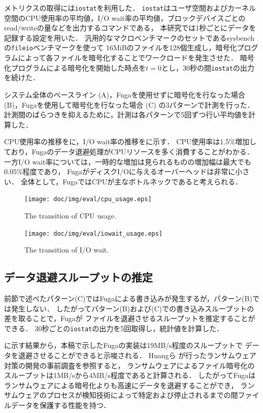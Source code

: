 メトリクスの取得には\texttt{iostat}を利用した．
\texttt{iostat}はユーザ空間およびカーネル空間のCPU使用率の平均値，I/O wait率の平均値，ブロックデバイスごとのread/writeの量などを出力するコマンドである，
本研究では1秒ごとにデータを記録する設定を用いた．
汎用的なマクロベンチマークのセットであるsysbench \cite{sysbench:online} の\texttt{fileio}ベンチマークを使って
16MiBのファイルを128個生成し，暗号化プログラムによって各ファイルを暗号化することでワークロードを発生させた．
暗号化プログラムによる暗号化を開始した時点を$t = 0$とし，30秒の間\texttt{iostat}の出力を続けた．

システム全体のベースライン (A)，Fugaを使用せずに暗号化を行なった場合 (B)，Fugaを使用して暗号化を行なった場合 (C) の3パターンで計測を行った．
計測間のばらつきを抑えるために，計測は各パターンで5回ずつ行い平均値を計算した．

CPU使用率の推移をに，I/O wait率の推移をに示す．
CPU使用率は1.5\%増加しており，Fugaのデータ退避処理がCPUリソースを多く消費することがわかる．
一方I/O wait率については，一時的な増加は見られるものの増加幅は最大でも0.05\%程度であり，
FugaがディスクI/Oに与えるオーバーヘッドは非常に小さい．
全体として，FugaではCPUが主なボトルネックであると考えられる．

\begin{figure}[tb]
  \centering
  \texttt{[image: doc/img/eval/cpu\_usage.eps]}
  \caption{The transition of CPU usage.}
  \label{fig:cpu-usage}
\end{figure}

\begin{figure}[tb]
  \centering
  \texttt{[image: doc/img/eval/iowait\_usage.eps]}
  \caption{The transition of I/O wait.}
  \label{fig:iowait}
\end{figure}

\subsection{データ退避スループットの推定}
前節で述べたパターン(C)ではFugaによる書き込みが発生するが，パターン(B)では発生しない．
したがってパターン(B)および(C)での書き込みスループットの差を取ることで，Fugaが
ファイルを退避させるスループットを推定することができる．
30秒ごとの\texttt{iostat}の出力を5回取得し，統計値を計算した．

に示す結果から，本稿で示したFugaの実装は19MB/s程度のスループットで
データを退避させることができると示唆される．
Huangら \cite{huang2017flashguard} が行ったランサムウェア対策の開発の事前調査を参照すると，
ランサムウェアによるファイル暗号化のスループットは1MB/sから4MB/s程度であると計算される．
したがってFugaはランサムウェアによる暗号化よりも高速にデータを退避することができ，
ランサムウェアのプロセスが検知技術によって特定および停止されるまでの間ファイルデータを保護する性能を持つ．

